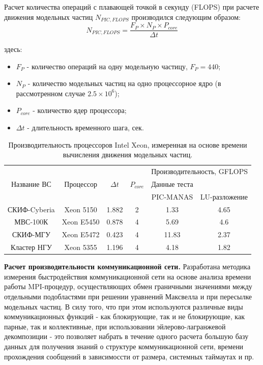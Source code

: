 Расчет количества операций с плавающей точкой в секунду (FLOPS) при расчете движения модельных частиц $N_{PIC,FLOPS}$ производился следующим образом:
\begin{equation}
N_{PIC,FLOPS} = \frac{F_P\times N_P \times P_{core}}{\Delta t}
\label{PIC_FLOPS}
\end{equation}

здесь:
\begin{itemize}
	\item $F_P$ - количество операций на одну модельную частицу, $F_P = 440$;
	\item $N_P$ - количество модельных частиц на одно процессорное ядро (в рассмотренном случае $2.5\times 10^6$);  
	\item $P_{core}$ - количество ядер процессора;
	\item $\Delta t$  - длительность временного шага, сек.
\end{itemize}	

\begin{table}[ht]
	\caption{Производительность процессоров Intel Xeon, измеренная на основе времени вычисления движения модельных частиц.}
	\label{PIC_vs_PROC_RAM}
	\begin{tabular}{|c|c|c|c|c|c|}
		\hline
		&            &            &             &       \multicolumn{2}{|c|}{Производительность, GFLOPS} \\ \cline{5-6}  	
		Название ВС  & Процессор  &  $\Delta t$ &$P_{core}$ & Данные теста  &  \\
		&            &             &           & PIC-MANAS     & LU-разложение \\ \hline
		СКИФ-Cyberia & Xeon 5150  &  1.882      & 2     &  1.33          & 4.65    \\ \hline
		МВС-100К     & Xeon E5450 &  0.878      & 4     & 5.69           & 4.6     \\ \hline 
		СКИФ-МГУ     & Xeon E5472 &  0.423      & 4     & 11.83          & 2.37       \\ \hline     
		Кластер НГУ  & Xeon 5355  &  1.196      & 4     & 4.18           & 1.82       \\ \hline
	\end{tabular}	
\end{table}



\clearpage

\textbf{Расчет производительности коммуникационной сети.}
Разработана методика измерения быстродействия коммуникационной сети на основе анализа времени работы MPI-процедур, осуществляющих обмен граничными значениями между отдельными подобластями при решении уравнений Максвелла и при пересылке модельных частиц. В силу того, что при этом используются различные виды коммуникационных функций  - как блокирующие, так и не блокирующие, как парные, так и коллективные, при использовании эйлерово-лагранжевой декомпозиции - это позволяет набрать в течение одного расчета большую базу данных для получения знаний о структуре коммуникационной сети, времени прохождения сообщений в зависимоссти от размера, системных таймаутах и пр. 

